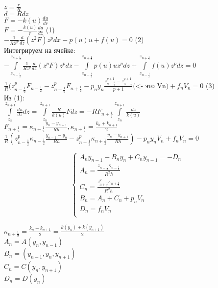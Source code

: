 $z = \frac{r}{R}$\\
$d = Rdz$\\
$F = -k(u)\frac{du}{dr}$\\
$F = -\frac{k(u)}{r} \frac{du}{dz}$ (1)\\
$-\frac{1}{RZ^{p}} \frac{d}{dz} (z^{2}F) z^{p} dx - p(u)u + f(u) = 0$ (2)\\
Интегрируем на ячейке:\\
$-\int\limits_{z_{n-\frac{1}{2}}}^{z_{n+\frac{1}{2}}}\frac{1}{Rz^{p}}\frac{d}{dz}(z^{p}F)z^{p}dz  - \int\limits_{z_{n-\frac{1}{2}}}^{z_{n+\frac{1}{2}}}p(u)u z^{p} dz + \int\limits_{z_{n-\frac{1}{2}}}^{z_{n+\frac{1}{2}}} f(u) z^{p} dz = 0$\\

$\frac{1}{R} (z^p_{n-\frac{1}{2}} F_{n-\frac{1}{2}} - z^p_{n+\frac{1}{2}} F_{n+\frac{1}{2}} - p_n y_n \frac{z^{p+1}_{n+\frac{1}{2}} - z^{p+1}_{n-\frac{1}{2}}}{p + 1} \text{(<- это Vn)} + f_n V_n = 0$  (3)\\

Из (1):\\
$\int\limits_{z_n}^{z_{n+1}} \frac{du}{dz}dz = \int\limits_{z_n}^{z_{n+1}}\frac{R}{k(u)}F dz = -R F_{n+\frac{1}{2}} \int\limits_{z_n}^{z_{n+1}}\frac{dz}{k(u)}$\\
$F_{n+\frac{1}{2}} = \kappa_{n+\frac{1}{2}}\frac{y_n  - y_{n+1}}{R h}, \kappa_{n+\frac{1}{2}} = \frac{k_{n} + k_{n+1}}{2}$\\

$\frac{1}{R}(z^p_{n-\frac{1}{2}} \kappa_{n-\frac{1}{2}} \frac{y_{n-1} - y_n}{Rh} - z^p_{n+\frac{1}{2}} \kappa_{n+\frac{1}{2}} \frac{y_n - y_{n+1}}{Rh}) - p_n y_n V_n + f_n V_n = 0$ 

\begin{equation}
\begin{cases}
A_n y_{n-1} - B_n y_n+ C_n y_{n-1} = - D_n\\
A_n = \frac{z_{n-\frac{1}{2}} \kappa_{n-\frac{1}{2}}}{R^2 h}\\
C_n = \frac{z_{n+\frac{1}{2}}^p \kappa_{n+\frac{1}{2}}}{R^2 h}\\
B_n = A_n + C_n + p_n V_n\\
D_n = f_n V_n\\
\end{cases}
\end{equation}

$\kappa_{n+\frac{1}{2}} = \frac{k_n + k_{n+1}}{2} = \frac{k(y_n) + k(y_{n+1})}{2}$\\
$A_n = A(y_n, y_{n-1})$\\
$B_n = (y_{n-1}, y_n, y_{n+1})$\\
$C_n = C(y_n, y_{n+1})$\\
$D_n = D(y_n)$\\

